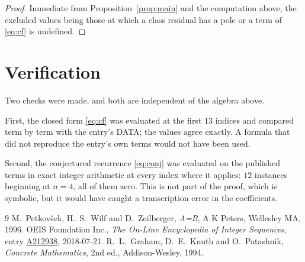 \documentclass[11pt,a4paper]{article}
\theoremstyle{plain}
\theoremstyle{definition}
\begin{document}
\begin{proof}
Immediate from Proposition~\ref{prop:main} and the computation above, the excluded values
being those at which a class residual has a pole or a term of \eqref{eq:cf} is undefined.
\end{proof}

\section{Verification}

Two checks were made, and both are independent of the algebra above.

First, the closed form \eqref{eq:cf} was evaluated at the first $13$ indices and
compared term by term with the entry's DATA; the values agree exactly. A formula that did
not reproduce the entry's own terms would not have been used.

Second, the conjectured recurrence \eqref{eq:conj} was evaluated on the published terms in
exact integer arithmetic at every index where it applies: $12$ instances beginning at
$n=4$, all of them zero. This is not part of the proof, which is symbolic, but it
would have caught a transcription error in the coefficients.

\begin{thebibliography}{9}
 M.~Petkov\v{s}ek, H.~S.~Wilf and D.~Zeilberger, \emph{A=B}, A K Peters,
Wellesley MA, 1996.
 OEIS Foundation Inc., \emph{The On-Line Encyclopedia of Integer Sequences},
entry \href{https://oeis.org/A212938}{A212938}, 2018-07-21.
 R.~L.~Graham, D.~E.~Knuth and O.~Patashnik, \emph{Concrete Mathematics},
2nd ed., Addison-Wesley, 1994.
\end{thebibliography}
\end{document}
